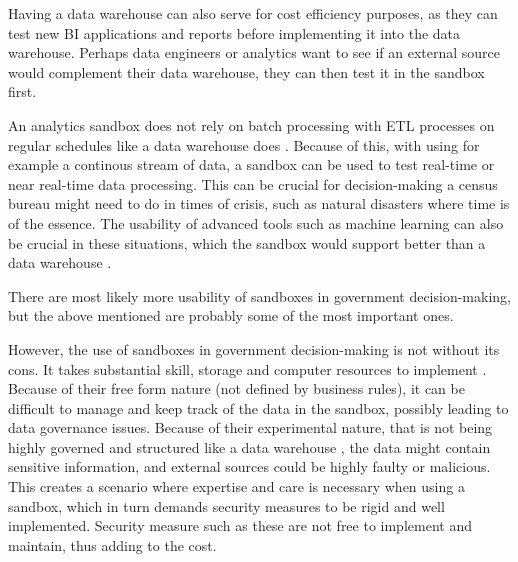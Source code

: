 Having a data warehouse can also serve for cost efficiency purposes, as they can test new BI applications and reports before implementing it into the data warehouse.
Perhaps data engineers or analytics want to see if an external source would complement their data warehouse, they can then test it in the sandbox first.

An analytics sandbox does not rely on batch processing with ETL processes on regular schedules like a data warehouse does \cite{l2video}.
Because of this, with using for example a continous stream of data, 
a sandbox can be used to test real-time or near real-time data processing.
This can be crucial for decision-making a census bureau might need to do in times of crisis, 
such as natural disasters where time is of the essence. 
The usability of advanced tools such as machine learning can also be crucial in these situations, 
which the sandbox would support better than a data warehouse \cite{l2video}.

There are most likely more usability of sandboxes in government decision-making,
but the above mentioned are probably some of the most important ones.

However, the use of sandboxes in government decision-making is not without its cons. It takes substantial skill, storage and computer resources to implement \cite{l2video}.
Because of their free form nature (not defined by business rules), it can be difficult to manage and keep track of the data in the sandbox, possibly leading to data governance issues.
Because of their experimental nature, that is not being highly governed and structured like a data warehouse \cite{l2video}, the data might contain sensitive information, and external sources could be highly faulty or malicious.
This creates a scenario where expertise and care is necessary when using a sandbox, which in turn demands security measures to be rigid and well implemented. Security measure such as these are not free to implement and maintain, thus adding to the cost.